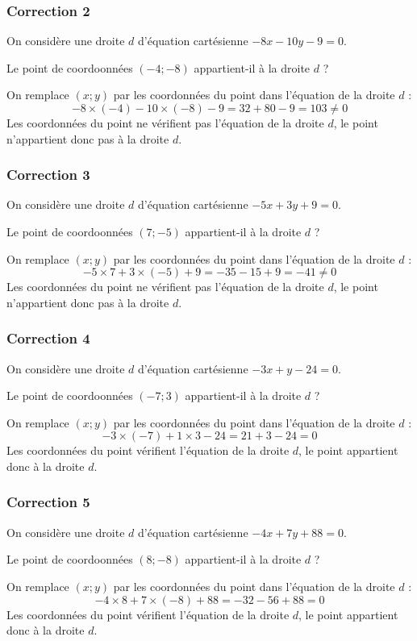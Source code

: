 \documentclass[15pt, mathserif]{beamer}
\begin{document}
\begin{frame}
\vspace{-10mm}
	\frametitle{Correction 2}
On considère une droite $d$ d'équation cartésienne $-8x-10y-9=0$. 
 
 Le point de coordoonnées $(-4;-8)$ appartient-il à la droite $d$ ? 
 
  \bigskip 
 On remplace $(x; y)$ par les coordonnées du point dans l'équation de la droite $d$ : $$ -8\times \left(-4\right)-10\times\left(-8\right)-9= 32+80-9=103\neq 0 $$ 
 Les coordonnées du point ne vérifient pas l'équation de la droite $d$, le point n'appartient donc pas à la droite $d$.\end{frame}


\begin{frame}
\vspace{-10mm}
	\frametitle{Correction 3}
On considère une droite $d$ d'équation cartésienne $-5x+3y+9=0$. 
 
 Le point de coordoonnées $(7;-5)$ appartient-il à la droite $d$ ? 
 
  \bigskip 
 On remplace $(x; y)$ par les coordonnées du point dans l'équation de la droite $d$ : $$ -5\times 7+3\times\left(-5\right)+9= -35-15+9=-41\neq 0 $$ 
 Les coordonnées du point ne vérifient pas l'équation de la droite $d$, le point n'appartient donc pas à la droite $d$.\end{frame}


\begin{frame}
\vspace{-10mm}
	\frametitle{Correction 4}
On considère une droite $d$ d'équation cartésienne $-3x+y-24=0$. 
 
 Le point de coordoonnées $(-7;3)$ appartient-il à la droite $d$ ? 
 
  \bigskip 
 On remplace $(x; y)$ par les coordonnées du point dans l'équation de la droite $d$ : $$ -3\times \left(-7\right)+1\times3-24= 21+3-24=0$$ 
 Les coordonnées du point vérifient l'équation de la droite $d$, le point appartient donc à la droite $d$.\end{frame}


\begin{frame}
\vspace{-10mm}
	\frametitle{Correction 5}
On considère une droite $d$ d'équation cartésienne $-4x+7y+88=0$. 
 
 Le point de coordoonnées $(8;-8)$ appartient-il à la droite $d$ ? 
 
  \bigskip 
 On remplace $(x; y)$ par les coordonnées du point dans l'équation de la droite $d$ : $$ -4\times 8+7\times\left(-8\right)+88= -32-56+88=0$$ 
 Les coordonnées du point vérifient l'équation de la droite $d$, le point appartient donc à la droite $d$.\end{frame}
\end{document}
